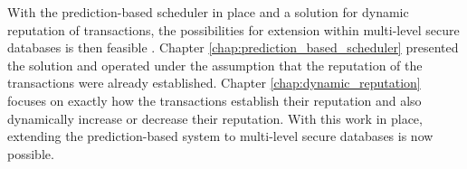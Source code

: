 With the prediction-based scheduler in place and a solution for dynamic reputation of transactions, the possibilities for extension within multi-level secure databases is then feasible . Chapter \ref{chap:prediction_based_scheduler} presented the solution and operated under the assumption that the reputation of the transactions were already established. Chapter \ref{chap:dynamic_reputation} focuses on exactly how the transactions establish their reputation and also dynamically increase or decrease their reputation. With this work in place, extending the prediction-based system to multi-level secure databases is now possible.